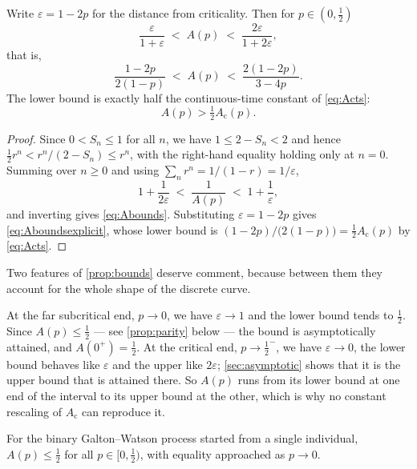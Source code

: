 \begin{proposition}
\label{prop:bounds}
Write $\varepsilon = 1-2p$ for the distance from criticality. Then for
$p\in(0,\tfrac12)$
\begin{equation}
\label{eq:Abounds}
\frac{\varepsilon}{1+\varepsilon} \;<\; A(p) \;<\; \frac{2\varepsilon}{1+2\varepsilon},
\end{equation}
that is,
\begin{equation}
\label{eq:Aboundsexplicit}
\frac{1-2p}{2(1-p)} \;<\; A(p) \;<\; \frac{2(1-2p)}{3-4p}.
\end{equation}
The lower bound is exactly half the continuous-time constant of \cref{eq:Acts}:
\begin{equation}
\label{eq:halfAc}
A(p) > \tfrac12 A_{\text{c}}(p).
\end{equation}
\end{proposition}

\begin{proof}
Since $0<S_n\le1$ for all $n$, we have $1\le 2-S_n<2$ and hence
$\tfrac12 r^n < r^n/(2-S_n) \le r^n$, with the right-hand equality holding only at
$n=0$. Summing over $n\ge0$ and using $\sum_n r^n = 1/(1-r) = 1/\varepsilon$,
\begin{equation*}
1+\frac{1}{2\varepsilon} \;<\; \frac{1}{A(p)} \;<\; 1+\frac{1}{\varepsilon},
\end{equation*}
and inverting gives \cref{eq:Abounds}. Substituting $\varepsilon = 1-2p$ gives
\cref{eq:Aboundsexplicit}, whose lower bound is
$(1-2p)/\bigl(2(1-p)\bigr) = \tfrac12 A_{\text{c}}(p)$ by \cref{eq:Acts}.
\end{proof}

Two features of \cref{prop:bounds} deserve comment, because between them they account
for the whole shape of the discrete curve.

At the far subcritical end, $p\to0$, we have $\varepsilon\to1$ and the lower bound
tends to $\tfrac12$. Since $A(p)\le\tfrac12$ --- see \cref{prop:parity} below --- the
bound is asymptotically attained, and $A(0^+) = \tfrac12$. At the critical end,
$p\to\tfrac12^-$, we have $\varepsilon\to0$, the lower bound behaves like $\varepsilon$
and the upper like $2\varepsilon$; \cref{sec:asymptotic} shows that it is the upper
bound that is attained there. So $A(p)$ runs from its lower bound at one end of the
interval to its upper bound at the other, which is why no constant rescaling of
$A_{\text{c}}$ can reproduce it.

\begin{proposition}
\label{prop:parity}
For the binary Galton--Watson process started from a single individual,
$A(p)\le\tfrac12$ for all $p\in[0,\tfrac12)$, with equality approached as $p\to0$.
\end{proposition}


